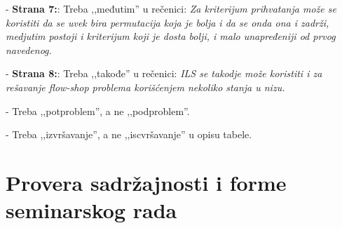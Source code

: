 \documentclass[a4paper]{report}
\begin{document}
- \textbf{Strana 7:}: Treba ,,međutim'' u rečenici: {\em Za kriterijum prihvatanja može se koristiti da se uvek bira permutacija koja je bolja i da se onda ona i zadrži, medjutim postoji i kriterijum koji je dosta bolji, i malo unapređeniji od prvog navedenog.}

- \textbf{Strana 8:}: Treba ,,takođe'' u rečenici: {\em ILS se takodje može koristiti i za rešavanje flow-shop problema korišćenjem nekoliko stanja u nizu.}

- Treba ,,potproblem'', a ne ,,podproblem''.

- Treba ,,izvršavanje'', a ne ,,iscvršavanje'' u opisu tabele.

\section{Provera sadržajnosti i forme seminarskog rada}
\end{document}

